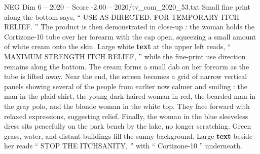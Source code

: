 \begin{textsample}{NEG Dim 6 – 2020 – Score -2.00 – 2020/tv\_com\_2020\_53.txt}
Small fine print along the bottom says, “ USE AS DIRECTED.
FOR TEMPORARY ITCH RELIEF. ” The product is then demonstrated in close-up : the woman holds the Cortizone-10 tube over her forearm with the cap open, squeezing a small amount of white cream onto the skin.
Large white \textbf{text} at the upper left reads, “ MAXIMUM STRENGTH ITCH RELIEF, ” while the fine-print use direction remains along the bottom.
The cream forms a small dab on her forearm as the tube is lifted away.
Near the end, the screen becomes a grid of narrow vertical panels showing several of the people from earlier now calmer and smiling : the man in the plaid shirt, the young dark-haired woman in red, the bearded man in the gray polo, and the blonde woman in the white top.
They face forward with relaxed expressions, suggesting relief.
Finally, the woman in the blue sleeveless dress sits peacefully on the park bench by the lake, no longer scratching.
Green grass, water, and distant buildings fill the sunny background.
Large \textbf{text} beside her reads “ STOP THE ITCHSANITY, ” with “ Cortizone-10 ” underneath.

\end{textsample}
